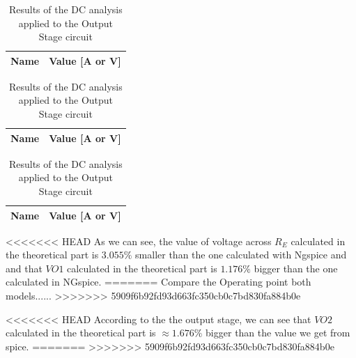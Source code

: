 \begin{table}
    \parbox{.45\linewidth}{
        \centering
        \begin{tabular}{|c|c|}
            \hline
            {\bf Name} & {\bf Value [A or V]} \\ \hline
            
        \end{tabular}
        \label{tab:GainStage_OP}
        \caption{Results of the DC analysis applied to the Gain Stage circuit}
    }
    \hfill
    \parbox{.45\linewidth}{
        \centering
        \begin{tabular}{|c|c|}
            {\bf Name} & {\bf Value [A or V]} \\ \hline
            
            \hline
        \end{tabular}
        \label{tab:Spice_OP}
        \caption{Results of the OP analysis applied to the whole circuit by using the Ngspice}
    }
    \hfill
    \parbox{.45\linewidth}{
        \centering
        \begin{tabular}{|c|c|}
            {\bf Name} & {\bf Value [A or V]} \\ \hline
            
            \hline
        \end{tabular}
        \label{tab:OutputStage_OP}
        \caption{Results of the DC analysis applied to the Output Stage circuit }
    }
\end{table}

<<<<<<< HEAD
As we can see, the value of voltage across $R_E$ calculated in the
theoretical part is $3.055\%$ smaller than the one calculated with
Ngspice and and that $VO1$ calculated in the theoretical part is
$1.176\%$ bigger than the one calculated in NGspice.
=======
Compare the Operating point both models......
>>>>>>> 5909f6b92fd93d663fc350cb0c7bd830fa884b0e


<<<<<<< HEAD
According to the the output stage, we can see that $VO2$ calculated
in the theoretical part is $\approx 1.676\%$ bigger than the value
we get from spice.
=======
>>>>>>> 5909f6b92fd93d663fc350cb0c7bd830fa884b0e

